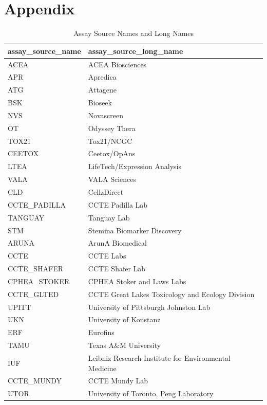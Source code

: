 \chapter{Appendix}\label{chap:appendix}
\begin{table}
    \begin{center}
    \caption{Assay Source Names and Long Names}
    \begin{tabular}{ll}
        \toprule
        assay\_source\_name & assay\_source\_long\_name \\
        \midrule
        ACEA & ACEA Biosciences \\
        APR & Apredica \\
        ATG & Attagene \\
        BSK & Bioseek \\
        NVS & Novascreen \\
        OT & Odyssey Thera \\
        TOX21 & Tox21/NCGC \\
        CEETOX & Ceetox/OpAns \\
        LTEA & LifeTech/Expression Analysis \\
        VALA & VALA Sciences \\
        CLD & CellzDirect \\
        CCTE\_PADILLA & CCTE Padilla Lab \\
        TANGUAY & Tanguay Lab \\
        STM & Stemina Biomarker Discovery \\
        ARUNA & ArunA Biomedical \\
        CCTE & CCTE Labs \\
        CCTE\_SHAFER & CCTE Shafer Lab \\
        CPHEA\_STOKER & CPHEA Stoker and Laws Labs \\
        CCTE\_GLTED & CCTE Great Lakes Toxicology and Ecology Division \\
        UPITT & University of Pittsburgh Johnston Lab \\
        UKN & University of Konstanz \\
        ERF & Eurofins \\
        TAMU & Texas A\&M University \\
        IUF & Leibniz Research Institute for Environmental Medicine \\
        CCTE\_MUNDY & CCTE Mundy Lab \\
        UTOR & University of Toronto, Peng Laboratory \\
        \bottomrule
    \end{tabular}
    ~\label{tab:laboratories} 
\end{center}
\end{table}

